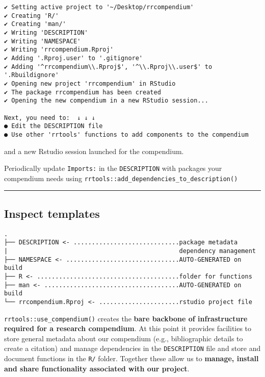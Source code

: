 \documentclass[
  letterpaper,
  DIV=11,
  numbers=noendperiod]{scrreprt}
\begin{document}
\begin{verbatim}
✔ Setting active project to '~/Desktop/rrcompendium'
✔ Creating 'R/'
✔ Creating 'man/'
✔ Writing 'DESCRIPTION'
✔ Writing 'NAMESPACE'
✔ Writing 'rrcompendium.Rproj'
✔ Adding '.Rproj.user' to '.gitignore'
✔ Adding '^rrcompendium\\.Rproj$', '^\\.Rproj\\.user$' to '.Rbuildignore'
✔ Opening new project 'rrcompendium' in RStudio
✔ The package rrcompendium has been created
✔ Opening the new compendium in a new RStudio session...

Next, you need to:  ↓ ↓ ↓ 
● Edit the DESCRIPTION file
● Use other 'rrtools' functions to add components to the compendium
\end{verbatim}

and a new Rstudio session launched for the compendium.

Periodically update \texttt{Imports:} in the \texttt{DESCRIPTION} with
packages your compendium needs using
\texttt{rrtools::add\_dependencies\_to\_description()}

\begin{center}\rule{0.5\linewidth}{0.5pt}\end{center}

\hypertarget{inspect-templates}{%
\subsection{Inspect templates}\label{inspect-templates}}

\begin{verbatim}
.
├── DESCRIPTION <- .............................package metadata
|                                               dependency management
├── NAMESPACE <- ...............................AUTO-GENERATED on build
├── R <- .......................................folder for functions
├── man <- .....................................AUTO-GENERATED on build
└── rrcompendium.Rproj <- ......................rstudio project file
\end{verbatim}

\texttt{rrtools::use\_compendium()} creates the \textbf{bare backbone of
infrastructure required for a research compendium}. At this point it
provides facilities to store general metadata about our compendium
(e.g., bibliographic details to create a citation) and manage
dependencies in the \texttt{DESCRIPTION} file and store and document
functions in the \texttt{R/} folder. Together these allow us to
\textbf{manage, install and share functionality associated with our
project}.
\end{document}
